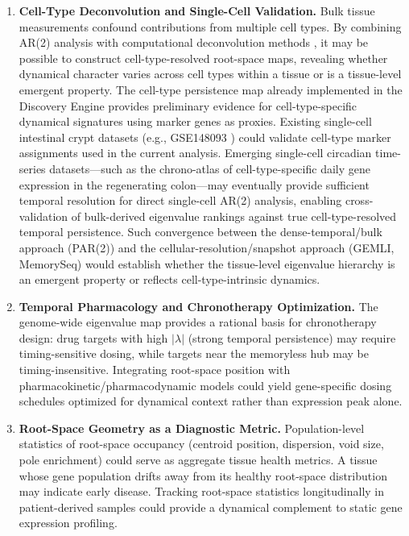 \documentclass[11pt,letterpaper]{article}
\begin{document}
\begin{enumerate}[leftmargin=*, label=\textbf{\arabic*.}]
\item \textbf{Cell-Type Deconvolution and Single-Cell Validation.}
Bulk tissue measurements confound contributions from multiple cell types. By combining AR(2) analysis with computational deconvolution methods \citep{newman2015, avila2018}, it may be possible to construct cell-type-resolved root-space maps, revealing whether dynamical character varies across cell types within a tissue or is a tissue-level emergent property. The cell-type persistence map already implemented in the Discovery Engine provides preliminary evidence for cell-type-specific dynamical signatures using marker genes as proxies. Existing single-cell intestinal crypt datasets (e.g., GSE148093 \citep{bues2022disco}) could validate cell-type marker assignments used in the current analysis. Emerging single-cell circadian time-series datasets---such as the chrono-atlas of cell-type-specific daily gene expression in the regenerating colon---may eventually provide sufficient temporal resolution for direct single-cell AR(2) analysis, enabling cross-validation of bulk-derived eigenvalue rankings against true cell-type-resolved temporal persistence. Such convergence between the dense-temporal/bulk approach (PAR(2)) and the cellular-resolution/snapshot approach (GEMLI, MemorySeq) would establish whether the tissue-level eigenvalue hierarchy is an emergent property or reflects cell-type-intrinsic dynamics.

\item \textbf{Temporal Pharmacology and Chronotherapy Optimization.}
The genome-wide eigenvalue map provides a rational basis for chronotherapy design: drug targets with high $|\lambda|$ (strong temporal persistence) may require timing-sensitive dosing, while targets near the memoryless hub may be timing-insensitive. Integrating root-space position with pharmacokinetic/pharmacodynamic models \citep{fujimoto2025} could yield gene-specific dosing schedules optimized for dynamical context rather than expression peak alone.

\item \textbf{Root-Space Geometry as a Diagnostic Metric.}
Population-level statistics of root-space occupancy (centroid position, dispersion, void size, pole enrichment) could serve as aggregate tissue health metrics. A tissue whose gene population drifts away from its healthy root-space distribution may indicate early disease. Tracking root-space statistics longitudinally in patient-derived samples could provide a dynamical complement to static gene expression profiling.

\end{enumerate}
\end{document}

